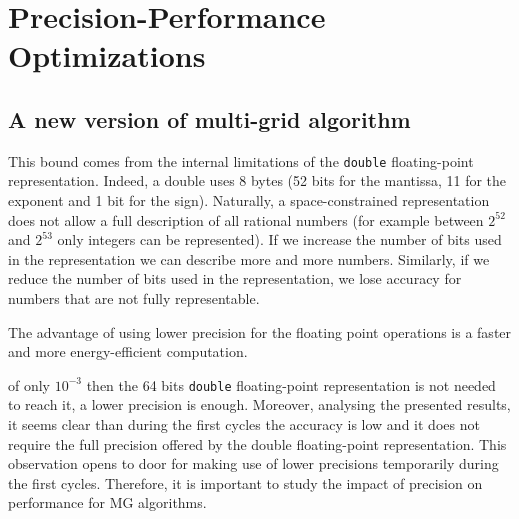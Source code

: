 \section{Precision-Performance Optimizations}
\label{sec:precision}

\subsection{A new version of multi-grid algorithm}

 This bound comes from the internal limitations of the
\texttt{double} floating-point representation.  Indeed, a double uses 8 bytes
(52 bits for the mantissa, 11 for the exponent and 1 bit for the sign).
Naturally, a space-constrained representation does not allow a full description
of all rational numbers (for example between $2^{52}$ and $2^{53}$ only
integers can be represented).  If we increase the number of bits used in the
representation we can describe more and more numbers. Similarly, if we reduce
the number of bits used in the representation, we lose accuracy for numbers
that are not fully representable.

The advantage of using lower precision for the floating point operations is a
faster and more energy-efficient computation. 

 of only $10^{-3}$ then the 64 bits \texttt{double} floating-point
representation is not needed to reach it, a lower precision is enough.
Moreover, analysing the presented results, it seems clear than during the first
cycles the accuracy is low and it does not require the full precision offered by
the double floating-point representation. This observation opens to door for
making use of lower precisions temporarily during the first cycles. Therefore, it
is important to study the impact of precision on performance for MG algorithms.

